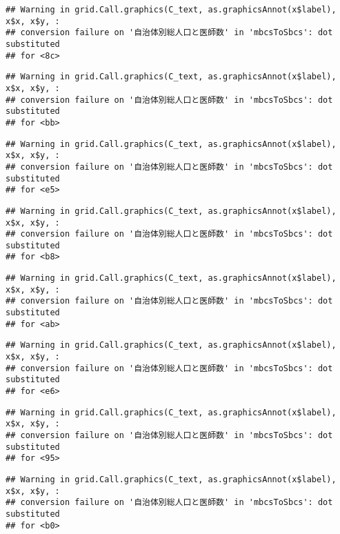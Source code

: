 \documentclass[
]{article}
\begin{document}
\begin{verbatim}
## Warning in grid.Call.graphics(C_text, as.graphicsAnnot(x$label), x$x, x$y, :
## conversion failure on '自治体別総人口と医師数' in 'mbcsToSbcs': dot substituted
## for <8c>
\end{verbatim}

\begin{verbatim}
## Warning in grid.Call.graphics(C_text, as.graphicsAnnot(x$label), x$x, x$y, :
## conversion failure on '自治体別総人口と医師数' in 'mbcsToSbcs': dot substituted
## for <bb>
\end{verbatim}

\begin{verbatim}
## Warning in grid.Call.graphics(C_text, as.graphicsAnnot(x$label), x$x, x$y, :
## conversion failure on '自治体別総人口と医師数' in 'mbcsToSbcs': dot substituted
## for <e5>
\end{verbatim}

\begin{verbatim}
## Warning in grid.Call.graphics(C_text, as.graphicsAnnot(x$label), x$x, x$y, :
## conversion failure on '自治体別総人口と医師数' in 'mbcsToSbcs': dot substituted
## for <b8>
\end{verbatim}

\begin{verbatim}
## Warning in grid.Call.graphics(C_text, as.graphicsAnnot(x$label), x$x, x$y, :
## conversion failure on '自治体別総人口と医師数' in 'mbcsToSbcs': dot substituted
## for <ab>
\end{verbatim}

\begin{verbatim}
## Warning in grid.Call.graphics(C_text, as.graphicsAnnot(x$label), x$x, x$y, :
## conversion failure on '自治体別総人口と医師数' in 'mbcsToSbcs': dot substituted
## for <e6>
\end{verbatim}

\begin{verbatim}
## Warning in grid.Call.graphics(C_text, as.graphicsAnnot(x$label), x$x, x$y, :
## conversion failure on '自治体別総人口と医師数' in 'mbcsToSbcs': dot substituted
## for <95>
\end{verbatim}

\begin{verbatim}
## Warning in grid.Call.graphics(C_text, as.graphicsAnnot(x$label), x$x, x$y, :
## conversion failure on '自治体別総人口と医師数' in 'mbcsToSbcs': dot substituted
## for <b0>
\end{verbatim}
\end{document}
